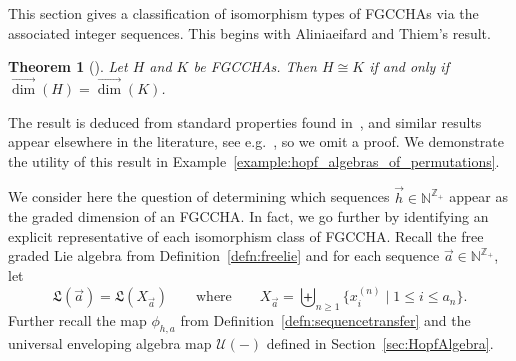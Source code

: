 \documentclass[11pt]{amsart}
\newtheorem{theorem}{Theorem}[section]
\theoremstyle{definition}
\numberwithin{equation}{section}
\def\NN{{\mathbb N}}
\def\ZZ{{\mathbb Z}}
\newcommand{\FGCCHA}{\textsf{FGCCHA}\xspace}
\newcommand{\FGCCHAs}{\textsf{FGCCHA}s\xspace}
\newcommand{\vecdim}{\overrightarrow{\dim}}
\newcommand{\lucas}[1]{\todo[size=\tiny,color=red!50]{#1 \\ \hfill --- Lucas}}
\begin{document}
This section gives a classification of isomorphism types of \FGCCHAs via the associated integer sequences.  
This begins with Aliniaeifard and Thiem's result.

\begin{theorem}[{\cite[Theorem 12]{AT22}}]
\label{thm:AT}
Let $H$ and $K$ be \FGCCHAs.  Then $H \cong K$ if and only if $\vecdim(H) = \vecdim(K)$.
\end{theorem}

The result is deduced from standard properties found in~\cite[Section 4.1]{L08}, and similar results appear elsewhere in the literature, see e.g.~\cite[Prop.~1.4]{AS05cc}, so we omit a proof.  We demonstrate the utility of this result in Example~\ref{example:hopf_algebras_of_permutations}.


We consider here the question of determining which sequences $\vec{h} \in \NN^{\ZZ_+}$
appear as the graded dimension of an \FGCCHA.  In fact,
we go further by identifying an explicit representative of each isomorphism class of \FGCCHA.  
Recall the free graded Lie algebra from Definition~\ref{defn:freelie} and for each sequence $\vec{a} \in \NN^{\ZZ_{+}}$, let
\begin{equation}
\label{eq:La}
\mathfrak{L}(\vec{a}) = \mathfrak{L}(X_{\vec{a}}) \qquad\text{where}\qquad X_{\vec{a}} = \biguplus_{n \ge 1} \{x^{(n)}_{i} \;|\; 1 \le i \le a_{n}\}.
\end{equation}
Further recall the map $\phi_{h, a}$ from
Definition~\ref{defn:sequencetransfer} and the universal enveloping
algebra map $\mathcal{U}(-)$ defined in Section~\ref{sec:HopfAlgebra}.
\end{document}
